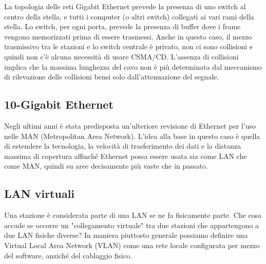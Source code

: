 La topologia delle reti Gigabit Ethernet prevede la presenza di uno switch al centro della stella, e tutti i computer (o altri switch) collegati ai vari rami della stella. Lo switch, per ogni porta, prevede la presenza di buffer dove i frame vengono memorizzati prima di essere trasmessi. Anche in questo caso, il mezzo trasmissivo tra le stazioni e lo switch centrale è privato, non ci sono collisioni e quindi non c'è alcuna necessità di usare CSMA/CD. L'assenza di collisioni implica che la massima lunghezza del cavo non è più determinata dal meccanismo di rilevazione delle collisioni bensi solo dall'attenuazione del segnale.

\subsection{10-Gigabit Ethernet}
Negli ultimi anni è stata predisposta un'ulteriore revisione di Ethernet per l'uso nelle MAN (Metropolitan Area Network). L'idea alla base in questo caso è quella di estendere la tecnologia, la velocità di trasferimento dei dati e la distanza massima di copertura affinché Ethernet possa essere usata sia come LAN che come MAN, quindi su aree decisamente più vaste che in passato.

\subsection{LAN virtuali}
Una stazione è considerata parte di una LAN se ne fa fisicamente parte. Che cosa accade se occorre un "collegamento virtuale" tra due stazioni che appartengono a due LAN fisiche diverse? In maniera piuttosto generale possiamo definire una Virtual Local Area Network (VLAN) come una rete locale configurata per mezzo del software, anziché del cablaggio fisico.

